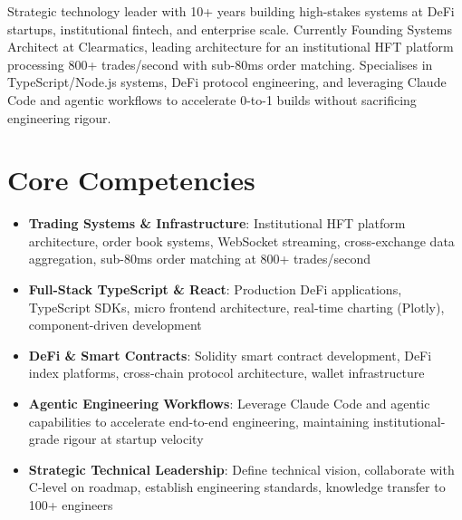 \documentclass[11pt,a4paper,sans]{moderncv}
\begin{document}
\makecvtitle


\vspace{6pt}
\small{Strategic technology leader with 10+ years building high-stakes systems at DeFi startups, institutional fintech, and enterprise scale. Currently Founding Systems Architect at Clearmatics, leading architecture for an institutional HFT platform processing 800+ trades/second with sub-80ms order matching. Specialises in TypeScript/Node.js systems, DeFi protocol engineering, and leveraging Claude Code and agentic workflows to accelerate 0-to-1 builds without sacrificing engineering rigour.}


\section{Core Competencies}
\vspace{1pt}
\begin{itemize}

\item \textbf{Trading Systems \& Infrastructure}: Institutional HFT platform architecture, order book systems, WebSocket streaming, cross-exchange data aggregation, sub-80ms order matching at 800+ trades/second
\vspace{1pt}

\item \textbf{Full-Stack TypeScript \& React}: Production DeFi applications, TypeScript SDKs, micro frontend architecture, real-time charting (Plotly), component-driven development
\vspace{1pt}

\item \textbf{DeFi \& Smart Contracts}: Solidity smart contract development, DeFi index platforms, cross-chain protocol architecture, wallet infrastructure
\vspace{1pt}

\item \textbf{Agentic Engineering Workflows}: Leverage Claude Code and agentic capabilities to accelerate end-to-end engineering, maintaining institutional-grade rigour at startup velocity
\vspace{1pt}

\item \textbf{Strategic Technical Leadership}: Define technical vision, collaborate with C-level on roadmap, establish engineering standards, knowledge transfer to 100+ engineers

\end{itemize}
\end{document}
